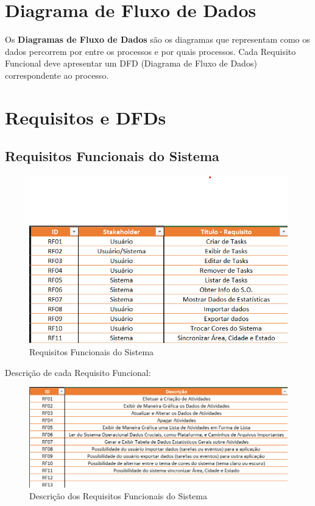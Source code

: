 \documentclass[a4paper,12pt]{article}
\begin{document}
\section{Diagrama de Fluxo de Dados}
Os \textbf{Diagramas de Fluxo de Dados} são os diagramas que representam como os dados percorrem por entre os processos e por quais processos. 
Cada Requisito Funcional deve apresentar um DFD (Diagrama de Fluxo de Dados) correspondente ao processo.

\section{Requisitos e DFDs}
\subsection{Requisitos Funcionais do Sistema}
\begin{figure}[H]
	\centering
	\includegraphics[scale=0.80]{requirements/functionals/requirements.png}
	\caption{Requisitos Funcionais do Sistema}
\end{figure}
Descrição de cada Requisito Funcional:
\begin{figure}[H]
	\centering
	\includegraphics[scale=0.80]{requirements/functionals/description.png}
	\caption{Descrição dos Requisitos Funcionais do Sistema}
\end{figure}
\end{document}
